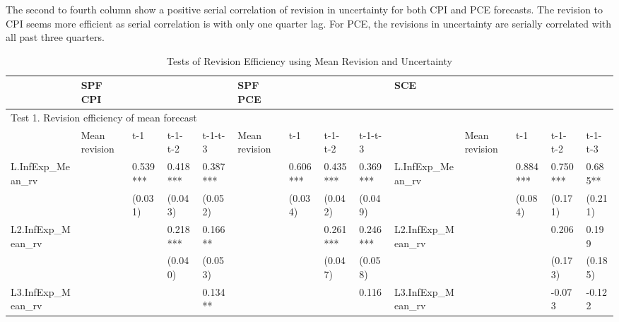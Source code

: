 \documentclass[12pt]{article}
\begin{document}
	The second to fourth column show a positive serial correlation of revision in uncertainty for both CPI and PCE forecasts. The revision to CPI seems more efficient as serial correlation is with only one quarter lag. For PCE, the revisions in uncertainty are serially correlated with all past three quarters. 
	
		\begin{table}
			\begin{adjustbox}{width={24cm},totalheight={14cm}}
				\begin{threeparttable}
					\caption{Tests of Revision Efficiency using Mean Revision and Uncertainty}
					\label{RevEfficiency}
				\begin{tabular}{llllllllllllll}
					\hline 
					& SPF CPI       &           &          &          & SPF PCE       &           &           &           & \multicolumn{5}{l}{SCE}                                              \\
					\hline 
					\multicolumn{14}{l}{Test 1.  Revision efficiency of mean forecast}                                                                                                                               \\
					\hline 
					& Mean revision & t-1       & t-1- t-2 & t-1-t-3  & Mean revision & t-1       & t-1- t-2  & t-1-t-3   &                     & Mean revision & t-1      & t-1- t-2 & t-1-t-3  \\
					\hline 
					L.InfExp\_Mean\_rv  &               & 0.539***  & 0.418*** & 0.387*** &               & 0.606***  & 0.435***  & 0.369***  & L.InfExp\_Mean\_rv  &               & 0.884*** & 0.750*** & 0.685**  \\
					&               & (0.031)   & (0.043)  & (0.052)  &               & (0.034)   & (0.042)   & (0.049)   &                     &               & (0.084)  & (0.171)  & (0.211)  \\
					L2.InfExp\_Mean\_rv &               &           & 0.218*** & 0.166**  &               &           & 0.261***  & 0.246***  & L2.InfExp\_Mean\_rv &               &          & 0.206    & 0.199    \\
					&               &           & (0.040)  & (0.053)  &               &           & (0.047)   & (0.058)   &                     &               &          & (0.173)  & (0.185)  \\
					L3.InfExp\_Mean\_rv &               &           &          & 0.134**  &               &           &           & 0.116     & L3.InfExp\_Mean\_rv &               &          & -0.073   & -0.122   \\

\end{tabular}
\end{threeparttable}
\end{adjustbox}
\end{table}
\end{document}
